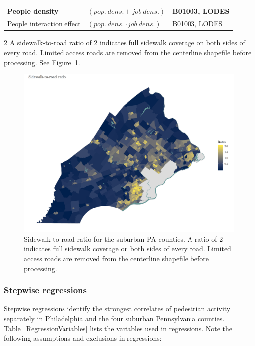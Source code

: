 \documentclass[paper=letterpaper, fontsize=11pt]{scrartcl}
\begin{document}
\begin{table}
\begin{threeparttable}
\begin{tabular}{|p{} p{} p{} |}
			\hline
			People density & $\left(pop.\:dens.+job\:dens. \right)$ & B01003, LODES \\
			\hline
			People interaction effect & $\left(pop.\:dens.\cdot job\:dens.\right)$ & B01003, LODES \\
			\hline
		\end{tabular}
		\begin{tablenotes}
			\item[2] A sidewalk-to-road ratio of 2 indicates full sidewalk coverage on both sides of every road. Limited access roads are removed from the centerline shapefile before processing. See Figure~\ref{srr}.
		\end{tablenotes}
	\end{threeparttable}
\end{table}

\FloatBarrier
\begin{figure}
	\centering
	\includegraphics[width = 9in]{srr.png}
	\caption{Sidewalk-to-road ratio for the suburban PA counties. A ratio of 2 indicates full sidewalk coverage on both sides of every road. Limited access roads are removed from the centerline shapefile before processing.} \label{srr}
\end{figure}
\FloatBarrier

\subsubsection{Stepwise regressions}
Stepwise regressions identify the strongest correlates of pedestrian activity separately in Philadelphia and the four suburban Pennsylvania counties. Table~\ref{RegressionVariables} lists the variables used in regressions. Note the following assumptions and exclusions in regressions:
\end{document}
